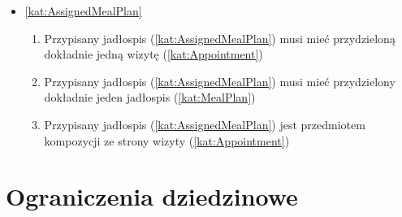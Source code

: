 \begin{itemize}[label={\textbf{Reguły dla}}, wide, labelwidth=!, labelindent=0pt]
    \item\ref{kat:AssignedMealPlan}
    \begin{enumerate}[label={\textbf{REG/\protect\threedigits{\arabic{enumi}}}}, wide, labelwidth=!, align=left, leftmargin=3cm, resume]
        \item Przypisany jadłospis (\ref{kat:AssignedMealPlan}) musi mieć przydzieloną dokładnie jedną wizytę (\ref{kat:Appointment})
        \item Przypisany jadłospis (\ref{kat:AssignedMealPlan}) musi mieć przydzielony dokładnie jeden jadłospis (\ref{kat:MealPlan})
        \item Przypisany jadłospis (\ref{kat:AssignedMealPlan}) jest przedmiotem kompozycji ze strony wizyty (\ref{kat:Appointment})
    \end{enumerate}
\end{itemize}

\section{Ograniczenia dziedzinowe}\label{sec:restrictions}

